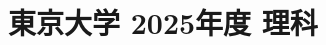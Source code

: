 ﻿\documentclass[../../uem_mat_tok_q.tex]{subfiles}
\begin{document}
    \section{東京大学 2025年度 理科}
    \subsection{　}
    
    \vfill
    \subsection{　}
    
    \vfill
    \newpage
    \subsection{　}
    
    \vfill
    \subsection{　}
    
    \vfill
    \newpage
    \subsection{　}
    
    \vfill
    \subsection{　}
    
    \vfill
\end{document}
